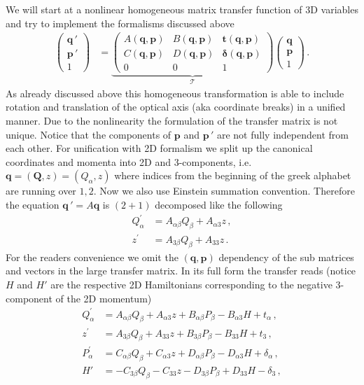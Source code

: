 \documentclass[12pt,a4paper,twoside,openright,BCOR10mm,headsepline,titlepage,abstracton,chapterprefix,final]{scrreprt}
\newcommand\Vector[1]{{\mathbf{#1}}}
\begin{document}
We will start at a nonlinear homogeneous matrix transfer function of 3D variables and try to implement the formalisms discussed above
\begin{align}
 \begin{pmatrix}
  \Vector{q}\,{}'\\
  \Vector{p}\,{}'\\
  1
 \end{pmatrix}
 &=
 \underbrace{\begin{pmatrix}
  A(\Vector{q},\Vector{p}) & B(\Vector{q},\Vector{p}) & \Vector{t}(\Vector{q},\Vector{p})\\
  C(\Vector{q},\Vector{p}) & D(\Vector{q},\Vector{p}) & \Vector{\delta}(\Vector{q},\Vector{p})\\
  0 & 0 & 1 
 \end{pmatrix}}_\mathcal{T}
 \begin{pmatrix}
  \Vector{q}\\
  \Vector{p}\\
  1
 \end{pmatrix}\,.
\end{align}
As already discussed above this homogeneous transformation is able to include rotation and translation of the optical axis (aka coordinate breaks) 
in a unified manner. Due to the nonlinearity the formulation of the transfer matrix is not unique. Notice that the components of $\Vector{p}$ and $\Vector{p}\,{}'$
are not fully independent from each other. For unification with 2D formalism we split up the canonical coordinates and momenta into 2D and 3-components, i.e.
$\Vector{q} = (\Vector{Q}, z) = (Q_\alpha, z)$ where indices from the beginning of the greek alphabet are running over $1,2$. Now we also use Einstein summation
convention. Therefore the equation $\Vector{q}\,{}' = A \Vector{q}$ is $(2+1)$ decomposed like the following
\begin{align}
 Q^\prime_\alpha &= A_{\alpha\beta} Q_\beta + A_{\alpha 3} z\,,\\
 z^\prime &= A_{3 \beta} Q_\beta + A_{33} z\,.
\end{align}
For the readers convenience we omit the $(\Vector{q},\Vector{p})$ dependency of the sub matrices and vectors in the large transfer matrix.
In its full form the transfer reads (notice $H$ and $H'$ are the respective 2D Hamiltonians corresponding to the negative 3-component of the 2D momentum)
\begin{subequations}
\label{eq:transfermatrixeqns}
\begin{align}
 Q^\prime_\alpha &= A_{\alpha\beta} Q_\beta + A_{\alpha 3} z + B_{\alpha\beta} P_\beta - B_{\alpha 3} H + t_\alpha\,,\\
 z^\prime &= A_{3 \beta} Q_\beta + A_{33} z + B_{3\beta} P_\beta - B_{33} H + t_3\,,\\
 P^\prime_\alpha &= C_{\alpha\beta} Q_\beta + C_{\alpha 3} z + D_{\alpha\beta} P_\beta - D_{\alpha 3} H + \delta_\alpha\,,\\
 H' &= -C_{3\beta} Q_\beta - C_{33} z - D_{3\beta} P_\beta + D_{33} H - \delta_3\,,
\end{align}
\end{subequations}
\end{document}
